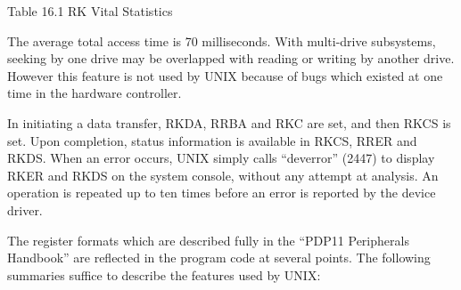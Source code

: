 \begin{center}
 Table 16.1 RK Vital Statistics
\end{center}

The average total access time is 70
milliseconds. With multi-drive subsystems,
seeking by one drive may be overlapped with reading or writing by
another drive. However this feature is
not used by UNIX because of bugs which
existed at one time in the hardware
controller.


In initiating a data transfer, RKDA,
RRBA and RKC are set, and then RKCS is
set. Upon completion, status information is available in RKCS, RRER and
RKDS. When an error occurs, UNIX simply
calls ``deverror'' (2447) to display RKER
and RKDS on the system console, without
any attempt at analysis. An operation
is repeated up to ten times before an
error is reported by the device driver.


The register formats which are
described fully in the ``PDP11 Peripherals Handbook'' are reflected in the
program code at several points. The
following summaries suffice to describe
the features used by UNIX:

